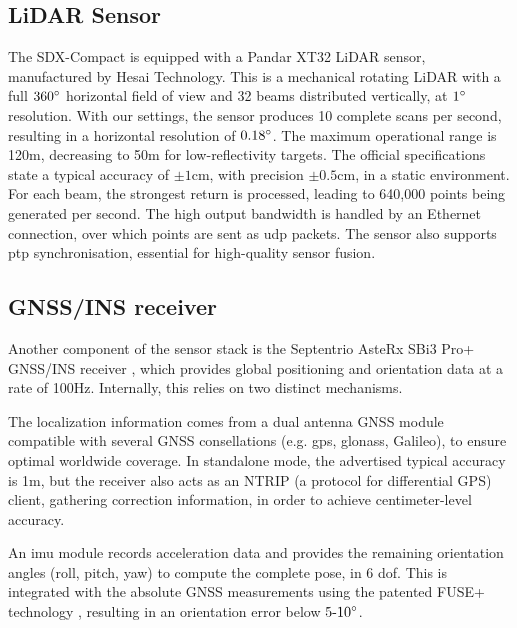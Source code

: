 \subsection{LiDAR Sensor}

The SDX-Compact  is equipped with a Pandar XT32 \cite{hesai_xt16_32_32m} LiDAR sensor, manufactured by Hesai Technology. This is a mechanical rotating LiDAR with a full $360 \degree$ horizontal field of view and 32 beams distributed vertically, at $1 \degree$ resolution. With our settings, the sensor produces 10 complete scans per second, resulting in a horizontal resolution of $0.18 \degree$. The maximum operational range is 120m, decreasing to 50m for low-reflectivity targets. The official specifications state a typical accuracy of $\pm 1$cm, with precision $\pm 0.5$cm, in a static environment. For each beam, the strongest return is processed, leading to 640,000 points being generated per second. The high output bandwidth is handled by an Ethernet connection, over which points are sent as \acrshort{udp} packets. The sensor also supports \acrshort{ptp} synchronisation, essential for high-quality sensor fusion.


\subsection{GNSS/INS receiver}

Another component of the sensor stack is the Septentrio AsteRx SBi3 Pro+ GNSS/INS receiver \cite{Septentrio_AsteRx_SBi3_Pro+}, which provides global positioning and orientation data at a rate of 100Hz. Internally, this relies on two distinct mechanisms.

The localization information comes from a dual antenna GNSS module compatible with several GNSS consellations (e.g. \acrshort{gps}, \acrshort{glonass}, Galileo), to ensure optimal worldwide coverage. In standalone mode, the advertised typical accuracy is 1m, but the receiver also acts as an NTRIP (a protocol for differential GPS) client, gathering correction information, in order to achieve centimeter-level accuracy.

An \acrfull{imu} module records acceleration data and provides the remaining orientation angles (roll, pitch, yaw) to compute the complete pose, in 6 \acrfull{dof}. This is integrated with the absolute GNSS measurements using the patented FUSE+ technology \cite{Septentrio_FUSE_Sensor_Fusion}, resulting in an orientation error below  $\text{5-10}\degree$.

